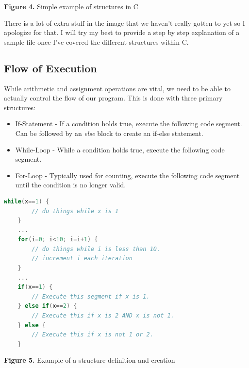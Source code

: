 \documentclass[paper=a4, fontsize=11pt]{scrartcl}
\numberwithin{equation}{section}		%
\numberwithin{figure}{section}			%
\numberwithin{table}{section}			%
\begin{document}
\vskip 0.05in
\centerline{\textbf{Figure 4. }Simple example of structures in C}
\vskip 0.1in

There is a lot of extra stuff in the image that we haven't really gotten to yet so I apologize for that. I will try my best to provide a step by step explanation of a sample file once I've covered the different structures within C.
\subsection{Flow of Execution}
While arithmetic and assignment operations are vital, we need to be able to actually control the flow of our program. This is done with three primary structures:
\begin{itemize}
	\item If-Statement - If a condition holds true, execute the following code segment. Can be followed by an \textit{else} block to create an if-else statement.
	\item While-Loop - While a condition holds true, execute the following code segment.
	\item For-Loop - Typically used for counting, execute the following code segment until the condition is no longer valid.
\end{itemize}

\newpage

\begin{framed}
	\begin{lstlisting}[language=C++,
	                   directivestyle={\color{black}}
        	            emph={int,char,double,float,unsigned},
                	     emphstyle={\color{blue}}
                	    ]
	while(x==1) {
		// do things while x is 1
	}
	...
	for(i=0; i<10; i=i+1) {
		// do things while i is less than 10.
		// increment i each iteration
	}
	...
	if(x==1) {
		// Execute this segment if x is 1.
	} else if(x==2) {
		// Execute this if x is 2 AND x is not 1.
	} else {
		// Execute this if x is not 1 or 2.
	}
	\end{lstlisting}
\end{framed}
\vskip 0.1in
\centerline{\textbf{Figure 5. }Example of a structure definition and creation}
\vskip 0.1in
\end{document}
